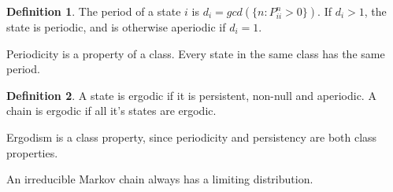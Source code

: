 \documentclass[12pt,letterpaper]{book}
\theoremstyle{definition}
\newtheorem{definition}{Definition}%
\begin{document}
\begin{definition}
  The period of a state $i$ is $d_i = gcd(\{n : P_{ii}^n > 0\})$. If $d_i > 1$, the state is periodic, and is otherwise aperiodic if $d_i=1$.
\end{definition}

Periodicity is a property of a class. Every state in the same class has the same period.

\begin{definition}
  A state is ergodic if it is persistent, non-null and aperiodic. A chain is ergodic if all it's states are ergodic. 
\end{definition}

Ergodism is a class property, since periodicity and persistency are both class properties.

\begin{theorem}
  An irreducible Markov chain always has a limiting distribution. 
\end{theorem}
\end{document}
